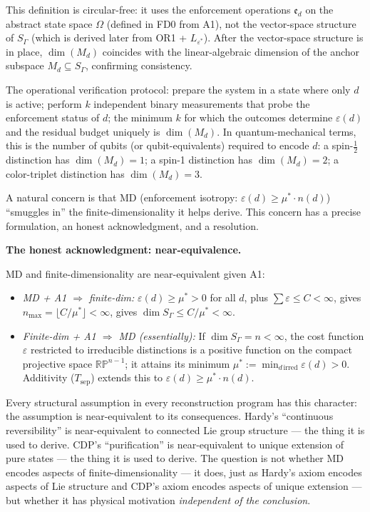 \documentclass[11pt]{article}
\theoremstyle{remark}
\begin{document}
This definition is circular-free: it uses the enforcement operations $\mathfrak{e}_d$ on the abstract state space $\Omega$ (defined in FD0 from A1), not the vector-space structure of $S_\Gamma$ (which is derived later from OR1 + $L_{\varepsilon^*}$).  After the vector-space structure is in place, $\dim(M_d)$ coincides with the linear-algebraic dimension of the anchor subspace $M_d \subseteq S_\Gamma$, confirming consistency.

The operational verification protocol: prepare the system in a state where only $d$ is active; perform $k$ independent binary measurements that probe the enforcement status of $d$; the minimum $k$ for which the outcomes determine $\varepsilon(d)$ and the residual budget uniquely is $\dim(M_d)$.  In quantum-mechanical terms, this is the number of qubits (or qubit-equivalents) required to encode $d$: a spin-$\tfrac{1}{2}$ distinction has $\dim(M_d) = 1$; a spin-1 distinction has $\dim(M_d) = 2$; a color-triplet distinction has $\dim(M_d) = 3$.





\label{box:MD_deep}

A natural concern is that MD (enforcement isotropy: $\varepsilon(d) \ge \mu^* \cdot n(d)$) ``smuggles in'' the finite-dimensionality it helps derive.  This concern has a precise formulation, an honest acknowledgment, and a resolution.

\medskip\noindent\textbf{The honest acknowledgment: near-equivalence.}

MD and finite-dimensionality are near-equivalent given A1:
\begin{itemize}[nosep,leftmargin=2em,itemsep=2pt]
\item \textit{MD + A1 $\Rightarrow$ finite-dim:} $\varepsilon(d) \ge \mu^* > 0$ for all $d$, plus $\sum \varepsilon \le C < \infty$, gives $n_{\max} = \lfloor C/\mu^* \rfloor < \infty$, gives $\dim S_\Gamma \le C/\mu^* < \infty$.
\item \textit{Finite-dim + A1 $\Rightarrow$ MD (essentially):} If $\dim S_\Gamma = n < \infty$, the cost function $\varepsilon$ restricted to irreducible distinctions is a positive function on the compact projective space $\mathbb{RP}^{n-1}$; it attains its minimum $\mu^* := \min_{d\, \mathrm{irred}} \varepsilon(d) > 0$.  Additivity ($T_{\mathrm{sep}}$) extends this to $\varepsilon(d) \ge \mu^* \cdot n(d)$.
\end{itemize}
Every structural assumption in every reconstruction program has this character: the assumption is near-equivalent to its consequences.  Hardy's ``continuous reversibility'' is near-equivalent to connected Lie group structure --- the thing it is used to derive.  CDP's ``purification'' is near-equivalent to unique extension of pure states --- the thing it is used to derive.  The question is not whether MD encodes aspects of finite-dimensionality --- it does, just as Hardy's axiom encodes aspects of Lie structure and CDP's axiom encodes aspects of unique extension --- but whether it has physical motivation \emph{independent of the conclusion}.
\end{document}
